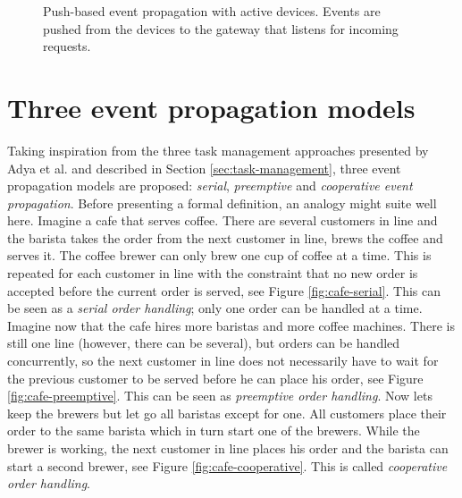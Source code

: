 \begin{figure}[h!]
    \centering
    \caption[Push-based event propagation.]{Push-based event propagation with
    active devices. Events are pushed from the devices to the gateway that
    listens for incoming requests.}
    \label{fig:push-based}
\end{figure}

\section{Three event propagation models}

Taking inspiration from the three task management approaches presented by Adya
et al. \cite{adya2002cooperative} and described in Section
\ref{sec:task-management}, three event propagation models are proposed:
\textit{serial}, \textit{preemptive} and \textit{cooperative event
propagation}. Before presenting a formal definition, an analogy might suite
well here. Imagine a cafe that serves coffee. There are several customers in
line and the barista takes the order from the next customer in line, brews the
coffee and serves it. The coffee brewer can only brew one cup of coffee at a
time. This is repeated for each customer in line with the constraint that no
new order is accepted before the current order is served, see Figure
\ref{fig:cafe-serial}. This can be seen as a \textit{serial order handling};
only one order can be handled at a time. Imagine now that the cafe hires more
baristas and more coffee machines. There is still one line (however, there can
be several), but orders can be handled concurrently, so the next customer in
line does not necessarily have to wait for the previous customer to be served
before he can place his order, see Figure \ref{fig:cafe-preemptive}. This can
be seen as \textit{preemptive order handling}. Now lets keep the brewers but
let go all baristas except for one.  All customers place their order to the
same barista which in turn start one of the brewers. While the brewer is
working, the next customer in line places his order and the barista can start a
second brewer, see Figure \ref{fig:cafe-cooperative}. This is called
\textit{cooperative order handling}.

